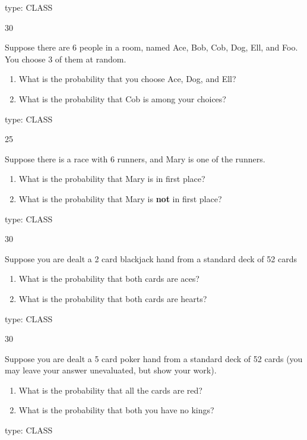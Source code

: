 \documentclass[12 pt]{article}
\begin{document}
\begin{itemize}
{}{}{type: CLASS}


 \ex
{}{30}
{
Suppose there are 6 people in a room, named Ace, Bob, Cob, Dog, Ell, and Foo.
You choose 3 of them at random. 
\begin{enumerate}

\item What is the probability that you choose Ace, Dog, and Ell?

\item
 What is the probability that Cob is among your choices?



\end{enumerate}


}{


}{}{type: CLASS}


 \ex
{}{25}
{
Suppose there is a race with 6 runners, and Mary is one of the runners.
\begin{enumerate}

\item What is the probability that Mary is in first place?

\item
 What is the probability that Mary is {\bf not} in first place?



\end{enumerate}


}{


}{}{type: CLASS}



 \ex
{}{30}
{
Suppose you are dealt a 2 card blackjack hand from a standard deck of 52 cards
\begin{enumerate}

\item
 What is the probability that both cards are aces?

\item 
 What is the probability that both cards are hearts?



\end{enumerate}


}{


}{}{type: CLASS}



 \ex
{}{30}
{
Suppose you are dealt a 5 card poker hand from a standard deck of 52 cards
(you may leave your answer unevaluated, but show your work).
\begin{enumerate}

\item
 What is the probability that all the cards are red?

\item 
 What is the probability that both you have no kings?



\end{enumerate}


}{


}{}{type: CLASS}





\end{itemize}
\end{document}
